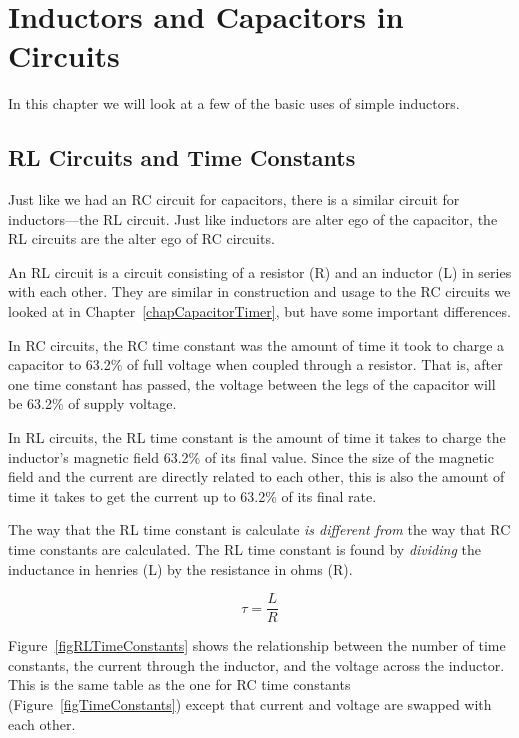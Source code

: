 \chapter{Inductors and Capacitors in Circuits}
\label{chapInductorTimer}

In this chapter we will look at a few of the basic uses of simple inductors.

\section{RL Circuits and Time Constants}

Just like we had an RC circuit for capacitors, there is a similar circuit for inductors---the RL circuit.
Just like inductors are alter ego of the capacitor, the RL circuits are the alter ego of RC circuits.

An RL circuit is a circuit consisting of a resistor (R) and an inductor (L) in series with each other.
They are similar in construction and usage to the RC circuits we looked at in Chapter~\ref{chapCapacitorTimer}, but have some important differences.

In RC circuits, the RC time constant was the amount of time it took to charge a capacitor to 63.2\% of full voltage when coupled through a resistor.
That is, after one time constant has passed, the voltage between the legs of the capacitor will be 63.2\% of supply voltage.

In RL circuits, the RL time constant is the amount of time it takes to charge the inductor's magnetic field 63.2\% of its final value.
Since the size of the magnetic field and the current are directly related to each other, this is also the amount of time it takes to get the current up to 63.2\% of its final rate.

The way that the RL time constant is calculate \emph{is different from} the way that RC time constants are calculated. 
The RL time constant is found by \emph{dividing} the inductance in henries (L) by the resistance in ohms (R).

\begin{equation}
\label{eqRLTimeContant}
\tau = \frac{L}{R}
\end{equation}

Figure~\ref{figRLTimeConstants} shows the relationship between the number of time constants, the current through the inductor, and the voltage across the inductor.
This is the same table as the one for RC time constants (Figure~\ref{figTimeConstants}) except that current and voltage are swapped with each other.

